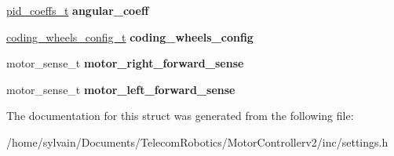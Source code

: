 \begin{DoxyCompactItemize}
\hypertarget{structrobot__settings__t_a5a70a3454f7b1edb417ef0c58ab517bc}{}\label{structrobot__settings__t_a5a70a3454f7b1edb417ef0c58ab517bc} 
\hyperlink{structpid__coeffs__t}{pid\+\_\+coeffs\+\_\+t} {\bfseries angular\+\_\+coeff}
\item 
\hypertarget{structrobot__settings__t_a611bdef4546a64a9dc7f8832fd301b54}{}\label{structrobot__settings__t_a611bdef4546a64a9dc7f8832fd301b54} 
\hyperlink{structcoding__wheels__config__t}{coding\+\_\+wheels\+\_\+config\+\_\+t} {\bfseries coding\+\_\+wheels\+\_\+config}
\item 
\hypertarget{structrobot__settings__t_ab5853c66822449b11707b78e35b79b75}{}\label{structrobot__settings__t_ab5853c66822449b11707b78e35b79b75} 
motor\+\_\+sense\+\_\+t {\bfseries motor\+\_\+right\+\_\+forward\+\_\+sense}
\item 
\hypertarget{structrobot__settings__t_a584be5ae8435d9f738acdad037b86f44}{}\label{structrobot__settings__t_a584be5ae8435d9f738acdad037b86f44} 
motor\+\_\+sense\+\_\+t {\bfseries motor\+\_\+left\+\_\+forward\+\_\+sense}
\end{DoxyCompactItemize}


The documentation for this struct was generated from the following file\+:\begin{DoxyCompactItemize}
\item 
/home/sylvain/\+Documents/\+Telecom\+Robotics/\+Motor\+Controllerv2/inc/settings.\+h\end{DoxyCompactItemize}
